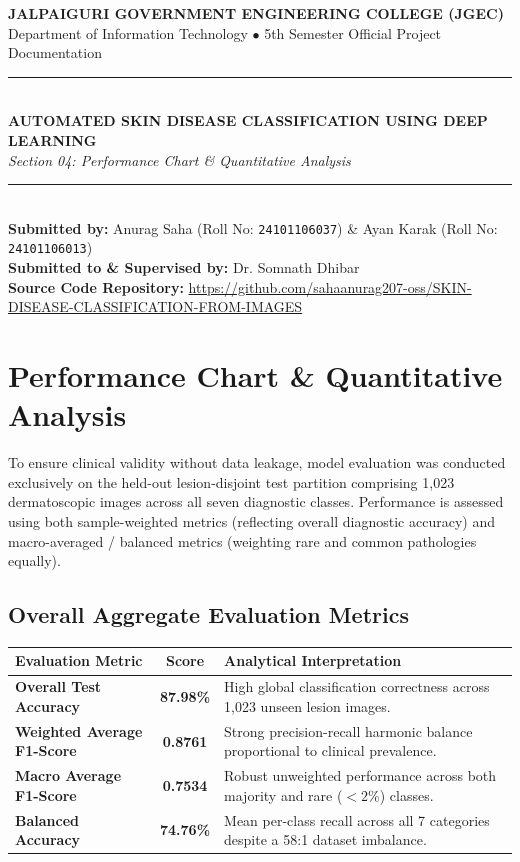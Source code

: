 \documentclass[12pt,a4paper]{article}
\begin{document}
\begin{center}
    {\Large \textbf{\color{primary} JALPAIGURI GOVERNMENT ENGINEERING COLLEGE (JGEC)}}\\[0.3em]
    {\normalsize Department of Information Technology $\bullet$ 5th Semester Official Project Documentation}\\[1em]
    \rule{\linewidth}{1.5pt}\\[0.5em]
    {\LARGE \textbf{AUTOMATED SKIN DISEASE CLASSIFICATION USING DEEP LEARNING}}\\[0.3em]
    {\large \textit{Section 04: Performance Chart \& Quantitative Analysis}}\\[0.3em]
    \rule{\linewidth}{1.5pt}\\[0.8em]
    \textbf{Submitted by:} Anurag Saha (Roll No: \texttt{24101106037}) \& Ayan Karak (Roll No: \texttt{24101106013})\\[0.3em]
    \textbf{Submitted to \& Supervised by:} Dr. Somnath Dhibar\\[0.3em]
    \textbf{Source Code Repository:} \url{https://github.com/sahaanurag207-oss/SKIN-DISEASE-CLASSIFICATION-FROM-IMAGES}
\end{center}

\vspace{0.8em}

\section{Performance Chart \& Quantitative Analysis}
To ensure clinical validity without data leakage, model evaluation was conducted exclusively on the held-out lesion-disjoint test partition comprising 1,023 dermatoscopic images across all seven diagnostic classes. Performance is assessed using both sample-weighted metrics (reflecting overall diagnostic accuracy) and macro-averaged / balanced metrics (weighting rare and common pathologies equally).

\subsection{Overall Aggregate Evaluation Metrics}
\begin{table}[h!]
\centering
\renewcommand{\arraystretch}{1.25}
\begin{tabularx}{\textwidth}{l c X}
\toprule
\textbf{Evaluation Metric} & \textbf{Score} & \textbf{Analytical Interpretation} \\
\midrule
\textbf{Overall Test Accuracy} & \textbf{87.98\%} & High global classification correctness across 1,023 unseen lesion images. \\
\textbf{Weighted Average F1-Score} & \textbf{0.8761} & Strong precision-recall harmonic balance proportional to clinical prevalence. \\
\textbf{Macro Average F1-Score} & \textbf{0.7534} & Robust unweighted performance across both majority and rare ($<2\%$) classes. \\
\textbf{Balanced Accuracy} & \textbf{74.76\%} & Mean per-class recall across all 7 categories despite a 58:1 dataset imbalance. \\
\bottomrule
\end{tabularx}
\end{table}
\end{document}
